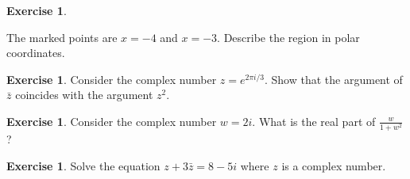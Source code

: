 \documentclass[12pt]{article}
\theoremstyle{plain}
\theoremstyle{definition}
\newtheorem{Ej}[Th]{Exercise}         %
\theoremstyle{remark}
\renewcommand{\:}{\colon}           %
\renewcommand{\.}{\Cdot}                %
\begin{document}
\begin{Ej}
\begin{figure}[h]
\begin{center}
\end{center}
  \end{figure}
  The marked points are $x=-4$ and $x=-3$. Describe the region in polar coordinates.
\end{Ej}

\begin{ptcb}
  \vspace*{3.25cm}
\end{ptcb}

\begin{Ej}
  Consider the complex number $z=e^{2\pi i/3}$. Show that the argument of $\bar{z}$ coincides with the argument $z^2$.
\end{Ej}

\begin{ptcb}
  \vspace*{3.25cm}
\end{ptcb}

\begin{Ej}
  Consider the complex number $w=2i$. What is the real part of $\frac{w}{1+w^2}$?
\end{Ej}

\begin{ptcb}
  \vspace*{3.25cm}
\end{ptcb}

\begin{Ej}
 Solve the equation $z+3\bar z=8-5i$ where $z$ is a complex number. 
\end{Ej}

\begin{ptcb}
  \vspace*{3.25cm}
\end{ptcb}


\end{document}
